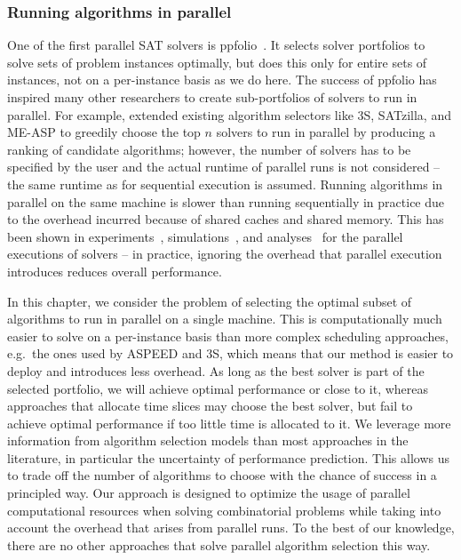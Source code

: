 \subsubsection{Running algorithms in parallel}

One of the first parallel SAT solvers is ppfolio~\cite{ppfolio}. It selects solver portfolios to solve sets of problem instances optimally, but does this only for entire sets of instances, not on a per-instance basis as we do here.
The success of ppfolio has inspired many other researchers to create sub-portfolios of solvers to run in parallel. For example, \cite{Marius2015} extended existing algorithm selectors like 3S, SATzilla, and ME-ASP to greedily choose the top $n$ solvers to run in parallel by producing a ranking of candidate algorithms; however, the number of solvers has to be specified by the user and the actual runtime of parallel runs is not considered -- the same runtime as for sequential execution is assumed.
Running algorithms in parallel on the same machine is slower than running sequentially in practice due to the overhead incurred because of shared caches and shared memory. This has been shown in experiments~\cite{pmlr-v140-kashgarani21a}, simulations~\cite{Yun,jtom1286288}, and analyses~\cite{biere} for the parallel executions of solvers -- in practice, ignoring the overhead that parallel execution introduces reduces overall performance.

\medskip

In this chapter, we consider the problem of selecting the optimal subset of algorithms to run in parallel on a single machine. This is computationally much easier to solve on a per-instance basis than more complex scheduling approaches, e.g.\ the ones used by ASPEED and 3S, which means that our method is easier to deploy and introduces less overhead. As long as the best solver is part of the selected portfolio, we will achieve optimal performance or close to it, whereas approaches that allocate time slices may choose the best solver, but fail to achieve optimal performance if too little time is allocated to it. We leverage more information from algorithm selection models than most approaches in the literature, in particular the uncertainty of performance prediction. This allows us to trade off the number of algorithms to choose with the chance of success in a principled way. Our approach is designed to optimize the usage of parallel computational resources when solving combinatorial problems while taking into account the overhead that arises from parallel runs. To the best of our knowledge, there are no other approaches that solve parallel algorithm selection this way.

